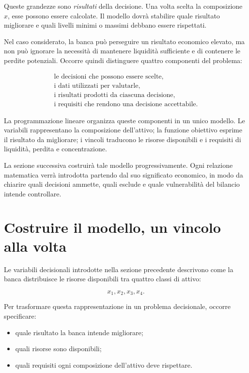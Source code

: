 Queste grandezze sono \emph{risultati} della decisione. Una volta scelta la
composizione $x$, esse possono essere calcolate. Il modello dovr\`a stabilire
quale risultato migliorare e quali livelli minimi o massimi debbano essere
rispettati.

Nel caso considerato, la banca pu\`o perseguire un risultato economico
elevato, ma non pu\`o ignorare la necessit\`a di mantenere liquidit\`a
sufficiente e di contenere le perdite potenziali. Occorre quindi distinguere
quattro componenti del problema:

\[
\begin{array}{c}
\text{le decisioni che possono essere scelte},
\\[4pt]
\text{i dati utilizzati per valutarle},
\\[4pt]
\text{i risultati prodotti da ciascuna decisione},
\\[4pt]
\text{i requisiti che rendono una decisione accettabile}.
\end{array}
\]

La programmazione lineare organizza queste componenti in un unico modello.
Le variabili rappresentano la composizione dell'attivo; la funzione obiettivo
esprime il risultato da migliorare; i vincoli traducono le risorse disponibili
e i requisiti di liquidit\`a, perdita e concentrazione.

La sezione successiva costruir\`a tale modello progressivamente. Ogni
relazione matematica verr\`a introdotta partendo dal suo significato
economico, in modo da chiarire quali decisioni ammette, quali esclude e quale
vulnerabilit\`a del bilancio intende controllare.

\section{Costruire il modello, un vincolo alla volta}

\label{sec:cap11-costruzione-modello}

Le variabili decisionali introdotte nella sezione precedente descrivono come
la banca distribuisce le risorse disponibili tra quattro classi di attivo:

\[
x_1,x_2,x_3,x_4.
\]

Per trasformare questa rappresentazione in un problema decisionale, occorre
specificare:

\begin{itemize}

\item quale risultato la banca intende migliorare;

\item quali risorse sono disponibili;

\item quali requisiti ogni composizione dell'attivo deve rispettare.

\end{itemize}

